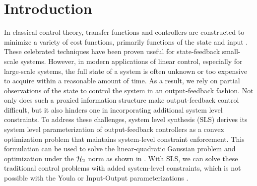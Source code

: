 \section{Introduction}\label{sec:introduction}


In classical control theory, transfer functions and controllers are constructed to minimize a variety of cost functions, primarily functions of the state and input \cite{doyle1992feedback} \cite{zhou1996robust}. These 
celebrated techniques have been proven useful for state-feedback small-scale systems. However, in modern applications of linear control, especially for large-scale systems, the full state of a system is often unknown or too expensive to acquire within a reasonable amount of time. 
As a result, we rely on partial observations of the state to control the system in an output-feedback fashion. 
Not only does such a proxied information structure make output-feedback control difficult, but it also hinders one in incorporating additional system level constraints.
To address these challenges, system level synthesis (SLS) \cite{anderson2019system, wang2019system} 
derives its system level parameterization of output-feedback controllers as a convex optimization problem that
 maintains system-level constraint enforcement. This formulation can be used to solve the linear-quadratic Gaussian problem and optimization under the $\mathcal{H}_2$ norm as shown in \cite{anderson2019system}. With SLS, we can 
 solve these traditional control problems with added system-level constraints, which is not possible with the Youla or Input-Output parameterizations \cite{furieri2019input} \cite{sabau2014youla} \cite{youla1976modern2}.
\iffalse
quickly because finding a controller involves solving a large, slow optimization problem. The output feedback 
case poses a greater challenge than state feedback because it requires optimizing over twice the number of transfer
functions, which increases the size of the optimization problem.
\fi

